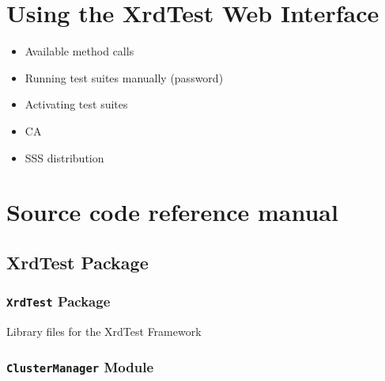 \documentclass[a4paper,11pt,openany]{sphinxmanual}
\begin{document}
\section{Using the XrdTest Web Interface}
\label{web-interface:using-the-xrdtest-web-interface}\label{web-interface::doc}\begin{itemize}
\item {} 
Available method calls

\item {} 
Running test suites manually (password)

\item {} 
Activating test suites

\item {} 
CA

\item {} 
SSS distribution

\end{itemize}


\section{Source code reference manual}
\label{ref-manual::doc}\label{ref-manual:source-code-reference-manual}

\subsection{XrdTest Package}
\label{ref-manual/XrdTest:xrdtest-package}\label{ref-manual/XrdTest::doc}

\subsubsection{\texttt{XrdTest} Package}
\label{ref-manual/XrdTest:id1}\label{ref-manual/XrdTest:module-XrdTest}
Library files for the XrdTest Framework


\subsubsection{\texttt{ClusterManager} Module}
\label{ref-manual/XrdTest:clustermanager-module}\label{ref-manual/XrdTest:module-XrdTest.ClusterManager}\label{ref-manual/XrdTest:module-ClusterManager}
\end{document}
